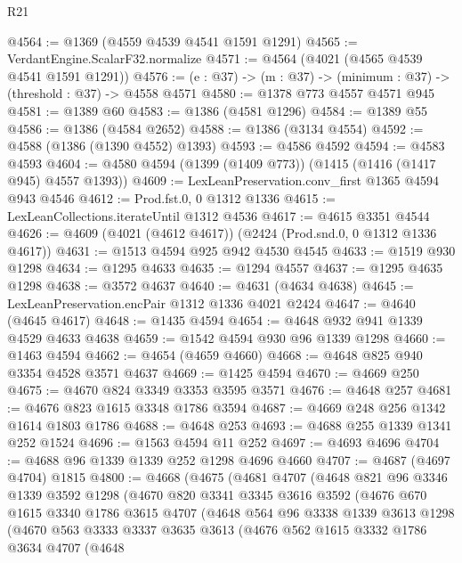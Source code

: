 \begin{lexlean}{R21}
\begin{coremodule}
@4564 := @1369 (@4559 @4539 @4541 @1591 @1291)
@4565 := VerdantEngine.ScalarF32.normalize
@4571 := @4564 (@4021 (@4565 @4539 @4541 @1591 @1291))
@4576 := (e : @37) -> (m : @37) -> (minimum : @37) -> (threshold : @37) -> @4558 @4571
@4580 := @1378 @773 @4557 @4571 @945
@4581 := @1389 @60
@4583 := @1386 (@4581 @1296)
@4584 := @1389 @55
@4586 := @1386 (@4584 @2652)
@4588 := @1386 (@3134 @4554)
@4592 := @4588 (@1386 (@1390 @4552) @1393)
@4593 := @4586 @4592
@4594 := @4583 @4593
@4604 := @4580 @4594 (@1399 (@1409 @773)) (@1415 (@1416 (@1417 @945) @4557 @1393))
@4609 := LexLeanPreservation.conv_first @1365 @4594 @943 @4546
@4612 := Prod.fst.{0, 0} @1312 @1336
@4615 := LexLeanCollections.iterateUntil @1312 @4536
@4617 := @4615 @3351 @4544
@4626 := @4609 (@4021 (@4612 @4617)) (@2424 (Prod.snd.{0, 0} @1312 @1336 @4617))
@4631 := @1513 @4594 @925 @942 @4530 @4545
@4633 := @1519 @930 @1298
@4634 := @1295 @4633
@4635 := @1294 @4557
@4637 := @1295 @4635 @1298
@4638 := @3572 @4637
@4640 := @4631 (@4634 @4638)
@4645 := LexLeanPreservation.encPair @1312 @1336 @4021 @2424
@4647 := @4640 (@4645 @4617)
@4648 := @1435 @4594
@4654 := @4648 @932 @941 @1339 @4529 @4633 @4638
@4659 := @1542 @4594 @930 @96 @1339 @1298
@4660 := @1463 @4594
@4662 := @4654 (@4659 @4660)
@4668 := @4648 @825 @940 @3354 @4528 @3571 @4637
@4669 := @1425 @4594
@4670 := @4669 @250
@4675 := @4670 @824 @3349 @3353 @3595 @3571
@4676 := @4648 @257
@4681 := @4676 @823 @1615 @3348 @1786 @3594
@4687 := @4669 @248 @256 @1342 @1614 @1803 @1786
@4688 := @4648 @253
@4693 := @4688 @255 @1339 @1341 @252 @1524
@4696 := @1563 @4594 @11 @252
@4697 := @4693 @4696
@4704 := @4688 @96 @1339 @1339 @252 @1298 @4696 @4660
@4707 := @4687 (@4697 @4704) @1815
@4800 := @4668
    (@4675
      (@4681
        @4707
        (@4648
          @821
          @96
          @3346
          @1339
          @3592
          @1298
          (@4670
            @820
            @3341
            @3345
            @3616
            @3592
            (@4676
              @670
              @1615
              @3340
              @1786
              @3615
              @4707
              (@4648
                @564
                @96
                @3338
                @1339
                @3613
                @1298
                (@4670
                  @563
                  @3333
                  @3337
                  @3635
                  @3613
                  (@4676
                    @562
                    @1615
                    @3332
                    @1786
                    @3634
                    @4707
                    (@4648

\end{coremodule}
\end{lexlean}

